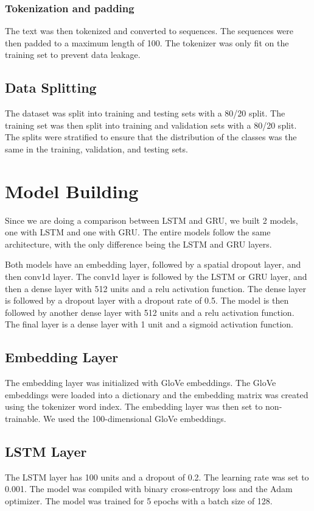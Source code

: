 \documentclass{article}
\begin{document}
\subsubsection{Tokenization and padding}
The text was then tokenized and converted to sequences. The sequences were then padded to a maximum length of 100. The tokenizer was only fit on the training set to prevent data leakage.

\subsection{Data Splitting}
The dataset was split into training and testing sets with a 80/20 split. The training set was then split into training and validation sets with a 80/20 split. The splits were stratified to ensure that the distribution of the classes was the same in the training, validation, and testing sets.

\section{Model Building}
Since we are doing a comparison between LSTM and GRU, we built 2 models, one with LSTM and one with GRU.
The entire models follow the same architecture, with the only difference being the LSTM and GRU layers.

Both models have an embedding layer, followed by a spatial dropout layer, and then conv1d layer. The conv1d layer is followed by the LSTM or GRU layer, and then a dense layer with 512 units and a relu activation function. The dense layer is followed by a dropout layer with a dropout rate of 0.5. The model is then followed by another dense layer with 512 units and a relu activation function. The final layer is a dense layer with 1 unit and a sigmoid activation function.

\subsection{Embedding Layer}
The embedding layer was initialized with GloVe embeddings. The GloVe embeddings were loaded into a dictionary and the embedding matrix was created using the tokenizer word index. The embedding layer was then set to non-trainable. We used the 100-dimensional GloVe embeddings.

\subsection{LSTM Layer}
The LSTM layer has 100 units and a dropout of 0.2. The learning rate was set to 0.001. The model was compiled with binary cross-entropy loss and the Adam optimizer. The model was trained for 5 epochs with a batch size of 128.
\end{document}
